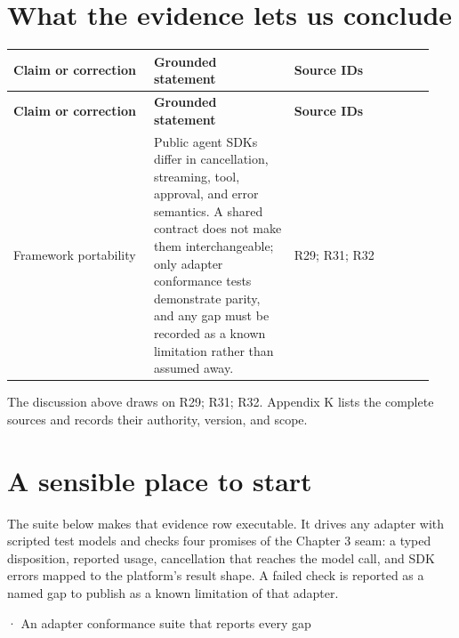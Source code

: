 \section{What the evidence lets us conclude}

\BookTableStart
\small
\begin{longtable}{@{}Y{0.3133\linewidth}Y{0.3133\linewidth}Y{0.3133\linewidth}@{}}
\color{white}\bfseries \textbf{Claim or correction} & \color{white}\bfseries \textbf{Grounded statement} & \color{white}\bfseries \textbf{Source IDs} \\
\endfirsthead
{}
\color{white}\bfseries \textbf{Claim or correction} & \color{white}\bfseries \textbf{Grounded statement} & \color{white}\bfseries \textbf{Source IDs} \\
\endhead
Framework portability & Public agent SDKs differ in cancellation, streaming, tool, approval, and error semantics. A shared contract does not make them interchangeable; only adapter conformance tests demonstrate parity, and any gap must be recorded as a known limitation rather than assumed away. & R29; R31; R32 \\
\end{longtable}
\BookTableEnd

The discussion above draws on R29; R31; R32. Appendix K lists the complete sources and records their authority, version, and scope.\par

\section{A sensible place to start}

The suite below makes that evidence row executable. It drives any adapter with scripted test models and checks four promises of the Chapter 3 seam: a typed disposition, reported usage, cancellation that reaches the model call, and SDK errors mapped to the platform's result shape. A failed check is reported as a named gap to publish as a known limitation of that adapter.\par

\BookSnake · An adapter conformance suite that reports every gap\par

